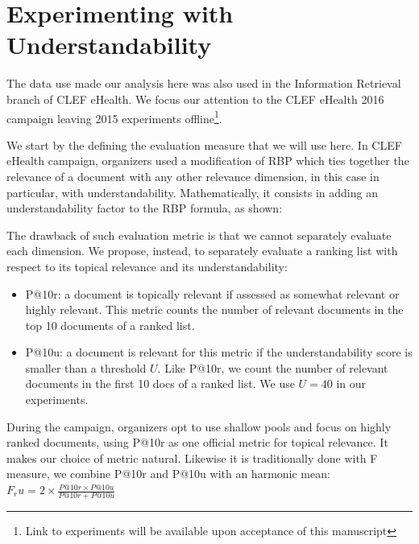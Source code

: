 \documentclass[runningheads,a4paper]{llncs}
\begin{document}
%

%

\section{Experimenting with Understandability}
\label{sec:experiments}

The data use made our analysis here was also used in the Information Retrieval branch of CLEF eHealth.
We focus our attention to the CLEF eHealth 2016 campaign leaving 2015 experiments offline\footnote{Link to experiments will be available upon acceptance of this manuscript}.

We start by the defining the evaluation measure that we will use here. 
In CLEF eHealth campaign, organizers used a modification of RBP which ties together the relevance of a document with any other relevance dimension, in this case in particular, with understandability.
Mathematically, it consists in adding an understandability factor to the RBP formula, as shown:

The drawback of such evaluation metric is that we cannot separately evaluate each dimension. We propose, instead, to separately evaluate a ranking list with respect to its topical relevance and its understandability:
\begin{itemize}
        \item P@10r: a document is topically relevant if assessed as somewhat relevant or highly relevant. This metric counts the number of relevant documents in the top 10 documents of a ranked list.
        \item P@10u: a document is relevant for this metric if the understandability score is smaller than a threshold $U$. Like P@10r, we count the number of relevant documents in the first 10 docs of a ranked list. We use $U = 40$ in our experiments. 
\end{itemize}

During the campaign, organizers opt to use shallow pools and focus on highly ranked documents, using P@10r as one official metric for topical relevance.
It makes our choice of metric natural. Likewise it is traditionally done with F measure, we combine P@10r and P@10u with an harmonic mean: $F_ru = 2 \times \frac{P@10r \times P@10u}{P@10r + P@10u}$



\end{document}
